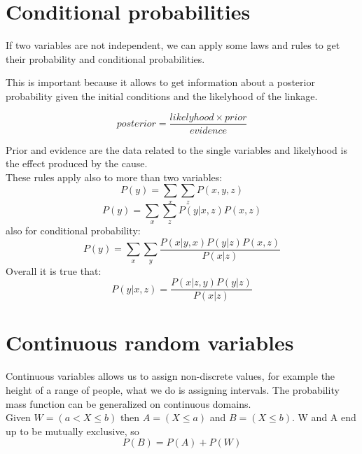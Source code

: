 \section{Conditional probabilities}
    If two variables are not independent, we can apply some laws and rules to get their probability and conditional probabilities.
    
    
    
    This is important because it allows to get information about a posterior probability given the initial conditions and the likelyhood of the linkage.
    
    $$posterior = \frac{likelyhood \times prior}{evidence}$$
    
    Prior and evidence are the data related to the single variables and likelyhood is the effect produced by the cause.\\
    These rules apply also to more than two variables:
    $$P(y) = \sum_x \sum_z P(x, y, z)$$
    $$P(y) = \sum_x \sum_z P(y | x, z) P(x, z)$$
    also for conditional probability:
    $$P(y) = \sum_x \sum_y \frac{P(x|y, x)P(y|z)P(x, z)}{P(x|z)}$$
    Overall it is true that:
    $$P(y|x, z) = \frac{P(x|z, y)P(y|z)}{P(x|z)}$$
    
\section{Continuous random variables}
    Continuous variables allows us to assign non-discrete values, for example the height of a range of people, what we do is assigning intervals. 
    The probability mass function can be generalized on continuous domains.\\
    Given $W = (a < X \leq b)$ then $A = (X \leq a)$ and $B = (X \leq b)$. W and A end up to be mutually exclusive, so 
    $$P(B) = P(A) + P(W)$$
    
    
